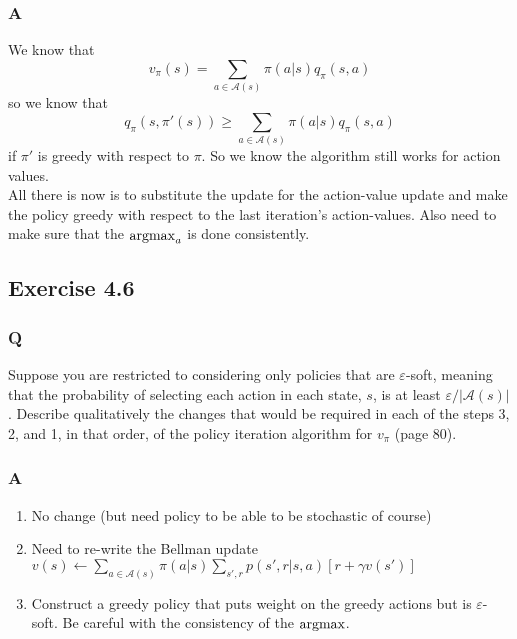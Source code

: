 \subsubsection{A}
We know that
\begin{equation}
    v_\pi(s) = \sum_{a \in \mathcal{A}(s)} \pi(a|s)q_\pi(s, a)
\end{equation}
so we know that
\begin{equation}
    q_\pi(s, \pi'(s)) \geq \sum_{a \in \mathcal{A}(s)} \pi(a|s)q_\pi(s, a)
\end{equation}
if $\pi'$ is greedy with respect to $\pi$. So we know the algorithm still works for action values.\\

All there is now is to substitute the update for the action-value update and make the policy greedy with respect to the last iteration's action-values. Also need to make sure that the $\operatorname*{argmax}_a$ is done consistently.

\subsection{Exercise 4.6}
\subsubsection{Q}
Suppose you are restricted to considering only policies that are $\varepsilon$-soft, meaning that the probability of selecting each action in each state, $s$, is at least $\varepsilon / |\mathcal{A}(s)|$. Describe qualitatively the changes that would be required in each of the steps 3, 2, and 1, in that order, of the policy iteration algorithm for $v_\pi$ (page 80).

\subsubsection{A}
\begin{enumerate}
    \item No change (but need policy to be able to be stochastic of course)
    \item Need to re-write the Bellman update $v(s) \longleftarrow \sum_{a \in \mathcal{A}(s)} \pi(a|s)\sum_{s', r}p(s', r|s, a)\left[ r + \gamma v(s') \right]$
    \item Construct a greedy policy that puts weight on the greedy actions but is $\varepsilon$-soft. Be careful with the consistency of the $\operatorname*{argmax}$.
\end{enumerate}

